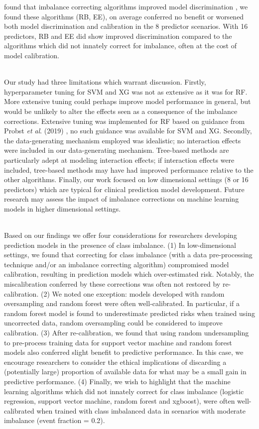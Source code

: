 \documentclass[AMA,STIX1COL,]{WileyNJD-v2}
\begin{document}
found that imbalance correcting algorithms improved model discrimination
\citep{kaur, rusboost, ee}, we found these algorithms (RB, EE), on
average conferred no benefit or worsened both model discrimination and
calibration in the 8 predictor scenarios. With 16 predictors, RB and EE
did show improved discrimination compared to the algorithms which did
not innately correct for imbalance, often at the cost of model
calibration.\\
\strut \\
Our study had three limitations which warrant discussion. Firstly,
hyperparameter tuning for SVM and XG was not as extensive as it was for
RF. More extensive tuning could perhaps improve model performance in
general, but would be unlikely to alter the effects seen as a
consequence of the imbalance corrections. Extensive tuning was
implemented for RF based on guidance from Probst \emph{et al}. (2019)
\citep{probst}, no such guidance was available for SVM and XG. Secondly,
the data-generating mechanism employed was idealistic; no interaction
effects were included in our data-generating mechanism. Tree-based
methods are particularly adept at modeling interaction effects; if
interaction effects were included, tree-based methods may have had
improved performance relative to the other algorithms. Finally, our work
focused on low dimensional settings (8 or 16 predictors) which are
typical for clinical prediction model development. Future research may
assess the impact of imbalance corrections on machine learning models in
higher dimensional settings.\\
\strut \\
Based on our findings we offer four considerations for researchers
developing prediction models in the presence of class imbalance. (1) In
low-dimensional settings, we found that correcting for class imbalance
(with a data pre-processing technique and/or an imbalance correcting
algorithm) compromised model calibration, resulting in prediction models
which over-estimated risk. Notably, the miscalibration conferred by
these corrections was often not restored by re-calibration. (2) We noted
one exception: models developed with random oversampling and random
forest were often well-calibrated. In particular, if a random forest
model is found to underestimate predicted risks when trained using
uncorrected data, random oversampling could be considered to improve
calibration. (3) After re-calibration, we found that using random
undersampling to pre-process training data for support vector machine
and random forest models also conferred slight benefit to predictive
performance. In this case, we encourage researchers to consider the
ethical implications of discarding a (potentially large) proportion of
available data for what may be a small gain in predictive performance.
(4) Finally, we wish to highlight that the machine learning algorithms
which did not innately correct for class imbalance (logistic regression,
support vector machine, random forest and xgboost), were often
well-calibrated when trained with class imbalanced data in scenarios
with moderate imbalance (event fraction = 0.2).
\end{document}
